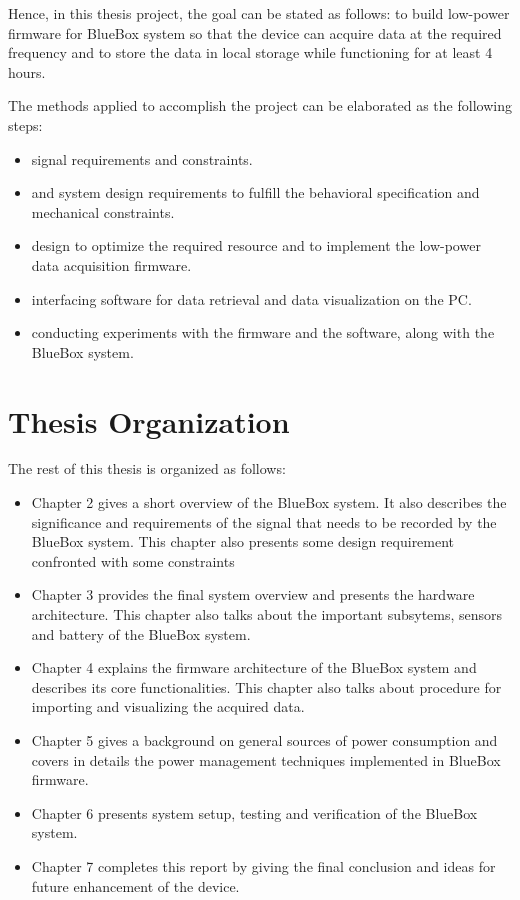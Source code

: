 Hence, in this thesis project, the goal can be stated as follows:
to build low-power firmware for BlueBox system so that the device can
acquire data at the required frequency and to store the data in local
storage while functioning for at least 4 hours. 
 
 The methods applied to accomplish the project can be elaborated as the following steps:
 \begin{itemize}
	\item signal requirements and constraints. 
 	
	\item and system design requirements to fulfill the behavioral
		specification and mechanical constraints.
 	
	\item design to optimize the required resource and to implement the
		low-power data acquisition firmware.
 	
	\item interfacing software for data retrieval and data
		visualization on the PC.
 	
	\item conducting experiments with the firmware and the software,
		along with the BlueBox system.
 \end{itemize}
 
\section{Thesis Organization}
The rest of this thesis is organized as follows:
\begin{itemize}
	\item Chapter 2 gives a short overview of the BlueBox system. It also describes the significance and requirements of the signal that needs to be recorded by the BlueBox system. This chapter also presents some design requirement confronted with some constraints
	
	\item Chapter 3 provides the final system overview and presents the hardware architecture. This chapter also talks about the important subsytems, sensors and battery of the BlueBox system.
	
	\item Chapter 4 explains the firmware architecture of the BlueBox system and describes its core functionalities. This chapter also talks about procedure for importing and visualizing the acquired data.
	
	\item Chapter 5 gives a background on general sources of power consumption and covers in details the power management techniques implemented in BlueBox firmware.
	
	\item Chapter 6 presents system setup, testing and verification of the BlueBox system. 
	
	\item
	Chapter 7 completes this report by giving the final conclusion and ideas for future enhancement of the device.
	
\end{itemize}
